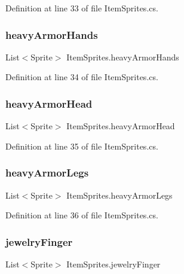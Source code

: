 Definition at line 33 of file Item\+Sprites.\+cs.

\mbox{\label{class_item_sprites_ace92c2b0f1cc1f4230210652c17aa94a}} 
\subsubsection{\texorpdfstring{heavyArmorHands}{heavyArmorHands}}
{\footnotesize\ttfamily List$<$Sprite$>$ Item\+Sprites.\+heavy\+Armor\+Hands}



Definition at line 34 of file Item\+Sprites.\+cs.

\mbox{\label{class_item_sprites_ab8cbbbf0055846461df6f9d67202b36d}} 
\subsubsection{\texorpdfstring{heavyArmorHead}{heavyArmorHead}}
{\footnotesize\ttfamily List$<$Sprite$>$ Item\+Sprites.\+heavy\+Armor\+Head}



Definition at line 35 of file Item\+Sprites.\+cs.

\mbox{\label{class_item_sprites_a2d27605263179ba8026d8cb53da8f07a}} 
\subsubsection{\texorpdfstring{heavyArmorLegs}{heavyArmorLegs}}
{\footnotesize\ttfamily List$<$Sprite$>$ Item\+Sprites.\+heavy\+Armor\+Legs}



Definition at line 36 of file Item\+Sprites.\+cs.

\mbox{\label{class_item_sprites_a73fd7ee6163d0724a0cd4cd0726d2b34}} 
\subsubsection{\texorpdfstring{jewelryFinger}{jewelryFinger}}
{\footnotesize\ttfamily List$<$Sprite$>$ Item\+Sprites.\+jewelry\+Finger}



